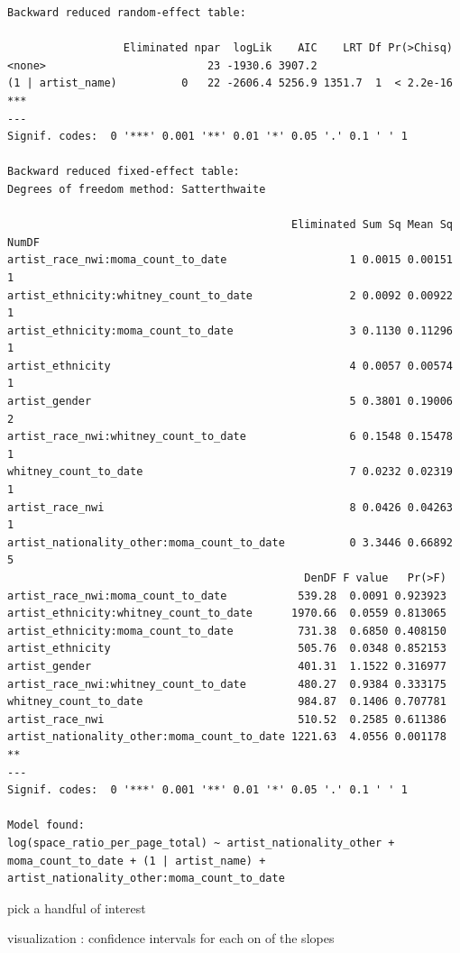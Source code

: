 \documentclass[
  letterpaper,
  DIV=11,
  numbers=noendperiod]{scrreprt}
\begin{document}
\begin{verbatim}
Backward reduced random-effect table:

                  Eliminated npar  logLik    AIC    LRT Df Pr(>Chisq)    
<none>                         23 -1930.6 3907.2                         
(1 | artist_name)          0   22 -2606.4 5256.9 1351.7  1  < 2.2e-16 ***
---
Signif. codes:  0 '***' 0.001 '**' 0.01 '*' 0.05 '.' 0.1 ' ' 1

Backward reduced fixed-effect table:
Degrees of freedom method: Satterthwaite 

                                            Eliminated Sum Sq Mean Sq NumDF
artist_race_nwi:moma_count_to_date                   1 0.0015 0.00151     1
artist_ethnicity:whitney_count_to_date               2 0.0092 0.00922     1
artist_ethnicity:moma_count_to_date                  3 0.1130 0.11296     1
artist_ethnicity                                     4 0.0057 0.00574     1
artist_gender                                        5 0.3801 0.19006     2
artist_race_nwi:whitney_count_to_date                6 0.1548 0.15478     1
whitney_count_to_date                                7 0.0232 0.02319     1
artist_race_nwi                                      8 0.0426 0.04263     1
artist_nationality_other:moma_count_to_date          0 3.3446 0.66892     5
                                              DenDF F value   Pr(>F)   
artist_race_nwi:moma_count_to_date           539.28  0.0091 0.923923   
artist_ethnicity:whitney_count_to_date      1970.66  0.0559 0.813065   
artist_ethnicity:moma_count_to_date          731.38  0.6850 0.408150   
artist_ethnicity                             505.76  0.0348 0.852153   
artist_gender                                401.31  1.1522 0.316977   
artist_race_nwi:whitney_count_to_date        480.27  0.9384 0.333175   
whitney_count_to_date                        984.87  0.1406 0.707781   
artist_race_nwi                              510.52  0.2585 0.611386   
artist_nationality_other:moma_count_to_date 1221.63  4.0556 0.001178 **
---
Signif. codes:  0 '***' 0.001 '**' 0.01 '*' 0.05 '.' 0.1 ' ' 1

Model found:
log(space_ratio_per_page_total) ~ artist_nationality_other + moma_count_to_date + (1 | artist_name) + artist_nationality_other:moma_count_to_date
\end{verbatim}

pick a handful of interest

visualization : confidence intervals for each on of the slopes
\end{document}
